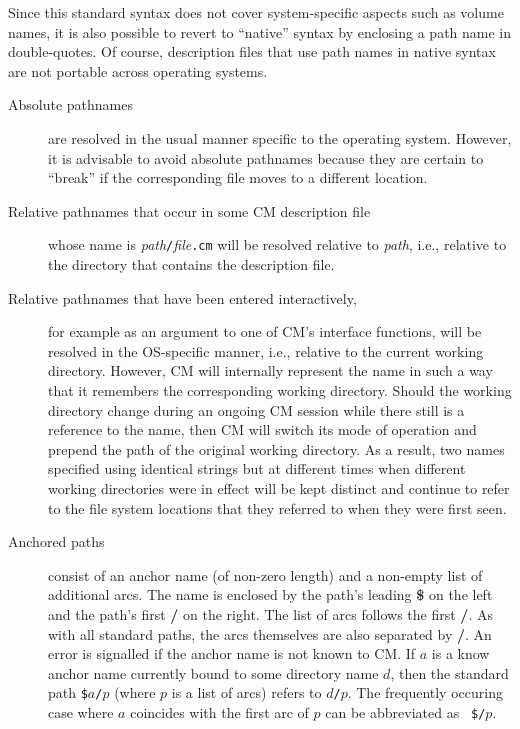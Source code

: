 \documentclass[titlepage,letterpaper]{article}
\begin{document}
Since this standard syntax does not cover system-specific aspects such
as volume names, it is also possible to revert to ``native'' syntax by
enclosing a path name in double-quotes.  Of course, description files
that use path names in native syntax are not portable across operating
systems.

\begin{description}
\item[Absolute pathnames] are resolved in the usual manner
specific to the operating system.  However, it is advisable to avoid
absolute pathnames because they are certain to ``break'' if the
corresponding file moves to a different location.
\item[Relative pathnames that occur in some CM description file] whose
name is {\it path}{\tt /}{\it file}{\tt .cm} will be resolved relative
to {\it path}, i.e., relative to the directory that contains the
description file.
\item[Relative pathnames that have been entered interactively,] for
example as an argument to one of CM's interface functions,
will be resolved in the OS-specific manner, i.e., relative to the
current working directory.  However, CM will internally represent the
name in such a way that it remembers the corresponding working
directory.  Should the working directory change during an ongoing CM
session while there still is a reference to the name, then CM will
switch its mode of operation and prepend the path of the original
working directory. As a result, two names specified using identical
strings but at different times when different working directories were
in effect will be kept distinct and continue to refer to the file
system locations that they referred to when they were first seen.
\item[Anchored paths] consist of an anchor name (of non-zero length)
and a non-empty list of additional arcs.  The name is enclosed by
the path's leading {\bf \$} on the left and the path's first {\bf /}
on the right.  The list of arcs follows the first {\bf /}.  As with
all standard paths, the arcs themselves are also separated by {\bf /}.
An error is signalled if the anchor name is not known to CM.
If $a$ is a know anchor name currently bound to some directory name
$d$, then the standard path {\tt \$}$a${\tt /}$p$ (where $p$ is a list
of arcs) refers to $d${\tt /}$p$.  The frequently occuring case where
$a$ coincides with the first arc of $p$ can be abbreviated as {\tt
\$/}$p$.
\end{description}
\end{document}
